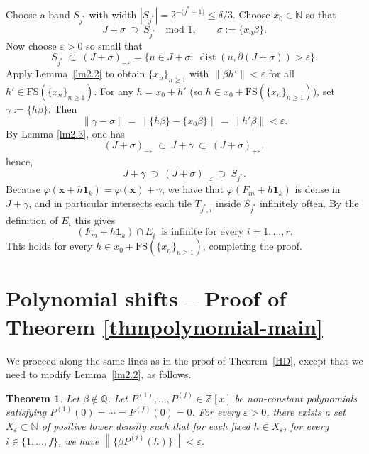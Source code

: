 \documentclass[11pt]{article}
\newtheorem{theorem}{Theorem}[section]
\def\Z{{\mathbb  Z}}
\def \Z{{\mathbb Z}}
\def\Q{\mathbb{Q}}
\newcommand{\nnorm}[1]{\left\|#1\right\|}
\theoremstyle{definition}
\begin{document}
Choose a band $S_{j^\ast}$ with width $|S_{j^\ast}|=2^{-({j^\ast+1)}}\le \delta/3$. Choose $x_0\in\mathbb N$ so that
\[
J+\sigma\ \supset\ S_{j^\ast}\quad\text{mod }1,\qquad \sigma:=\{x_0\beta\}.
\]
Now choose $\varepsilon>0$ so small that
\[
S_{j^\ast}\ \subset\ (J+\sigma)_{-\varepsilon}=\{u\in J+\sigma:\ \operatorname{dist}(u,\partial(J+\sigma))>\varepsilon\}.
\]
Apply Lemma~\ref{lm2.2} to obtain $\{x_n\}_{n\ge 1}$ with $\|\beta h'\|<\varepsilon$ for all $h'\in \mathrm{FS}(\{x_n\}_{n\ge 1})$.
For any $h=x_0+h'$ (so $h\in x_0+\mathrm{FS}(\{x_n\}_{n\ge 1})$), set $\gamma:=\{h\beta\}$. Then
\[
\|\gamma-\sigma\|=\|\{h\beta\}-\{x_0\beta\}\|=\|h'\beta\|<\varepsilon.
\]
By Lemma \ref{lm2.3}, one has
\[
(J+\sigma)_{-\varepsilon}\ \subset\ J+\gamma\ \subset\ (J+\sigma)_{+\varepsilon},
\]
hence,
\[
J+\gamma\ \supset\ (J+\sigma)_{-\varepsilon}\ \supset\ S_{j^\ast}.
\]
Because $\varphi(\mathbf{x}+h\mathbf{1}_k)=\varphi(\mathbf{x})+\gamma$, we have that $\varphi(F_m+h\mathbf{1}_k)$ is dense in $J+\gamma$,
and in particular intersects each tile $T_{j^*, i}$ inside $S_{j^\ast}$ infinitely often.
By the definition of $E_i$ this gives
\[
(F_m+h\mathbf{1}_k)\cap E_i\ \text{ is infinite for every } i=1,\dots,r.
\]
This holds for every $h\in x_0+\mathrm{FS}(\{x_n\}_{n\ge 1})$, completing the proof.




\section{Polynomial shifts -- Proof of Theorem \ref{thmpolynomial-main}}


We proceed along the same lines as in the proof of Theorem~\ref{HD}, except that we need to modify Lemma~\ref{lm2.2}, as follows. 
\begin{theorem}\label{lm2.2'}
Let $\beta \notin \Q$. Let $P^{(1)},\dots,P^{(f)}\in\Z[x]$ be non-constant polynomials satisfying $P^{(1)}(0)=\cdots=P^{(f)}(0)=0$. For every $\varepsilon>0$, there exists a set $X_{\varepsilon}\subset \mathbb{N}$ of positive lower density such that for each fixed $h\in X_{\varepsilon}$,  for every $i\in \{1,\dots,f\}$, we have $\nnorm{\{\beta P^{(i)}(h)\}}<\varepsilon$. 
\end{theorem}
\end{document}
